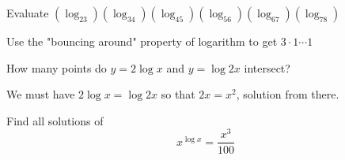 \documentclass[11pt]{scrreport}
\begin{document}
\begin{problem}
    Evaluate $(\log_23)(\log_34)(\log_45)(\log_56)(\log_67)(\log_78)$
\end{problem}
\begin{soln}
    Use the "bouncing around" property of logarithm to get $3\cdot1\cdots1$
\end{soln}

\begin{problem}
    How many points do $y=2\log x$ and $y=\log2x$ intersect?
\end{problem}
\begin{soln}
    We must have $2\log x = \log 2x$ so that $2x=x^2$, solution from there.
\end{soln}

\begin{problem}
    Find all solutions of \[x^{\log x} = \frac{x^3}{100}\]
\end{problem}
\begin{soln}
\end{soln}

\begin{problem}
\end{problem}
\begin{soln}
\end{soln}

\begin{problem}
\end{problem}
\begin{soln}
\end{soln}

\begin{problem}
\end{problem}
\begin{soln}
\end{soln}

\begin{problem}
\end{problem}
\begin{soln}
\end{soln}

\begin{problem}
\end{problem}
\begin{soln}
\end{soln}
\end{document}
